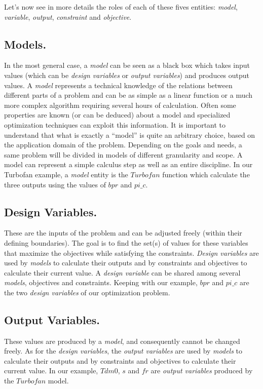 Let's now see in more details the roles of each of these fives entities: \emph{model}, \emph{variable}, \emph{output}, \emph{constraint} and \emph{objective}.

\subsection{Models.}

In the most general case, a \emph{model} can be seen as a black box which takes input values (which can be \emph{design variables} or \emph{output variables}) and produces output values. A \emph{model} represents a technical knowledge of the relations between different parts of a problem and can be as simple as a linear function or a much more complex algorithm requiring several hours of calculation. Often some properties are known (or can be deduced) about a model and specialized optimization techniques can exploit this information. It is important to understand that what is exactly a \enquote{model} is quite an arbitrary choice, based on the application domain of the problem. Depending on the goals and needs, a same problem will be divided in models of different granularity and scope. A model can represent a simple calculus step as well as an entire discipline.
In our Turbofan example, a \emph{model} entity is the $Turbofan$ function which calculate the three outputs using the values of $bpr$ and $pi\_c$.

\subsection{Design Variables.}

These are the inputs of the problem and can be adjusted freely (within their defining boundaries). The goal is to find the set(s) of values for these variables that maximize the objectives while satisfying the constraints.
\emph{Design variables} are used by \emph{models} to calculate their outputs and by constraints and objectives to calculate their current value. A \emph{design variable} can be shared among several \emph{models}, objectives and constraints.
Keeping with our example, $bpr$ and $pi\_c$ are the two \emph{design variables} of our optimization problem.

\subsection{Output Variables.}

These values are produced by a \emph{model}, and consequently cannot be changed freely.
As for the \emph{design variables}, the \emph{output variables} are used by \emph{models} to calculate their outputs and by constraints and objectives to calculate their current value.
In our example, $Tdm0$, $s$ and $fr$ are \emph{output variables} produced by the $Turbofan$ model.


